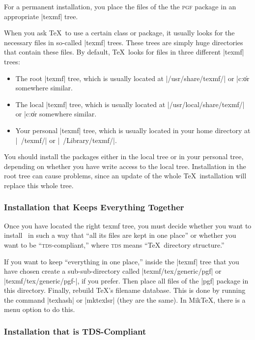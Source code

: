 For a permanent installation, you place the files of the
the \textsc{pgf} package in an appropriate |texmf| tree. 

When you ask \TeX\ to use a certain class or package, it usually looks
for the necessary files in so-called |texmf| trees. These trees
are simply huge directories that contain these files. By default,
\TeX\ looks for files in three different |texmf| trees:
\begin{itemize}
\item
  The root |texmf| tree, which is usually located at
  |/usr/share/texmf/| or |c:\texmf\| or somewhere similar.
\item
  The local  |texmf| tree, which is usually located at
  |/usr/local/share/texmf/| or |c:\localtexmf\| or somewhere similar.
\item
  Your personal  |texmf| tree, which is usually located in your home
  directory at |~/texmf/| or |~/Library/texmf/|.   
\end{itemize}

You should install the packages either in the local tree or in
your personal tree, depending on whether you have write access to the
local tree. Installation in the root tree can cause problems, since an
update of the whole \TeX\ installation will replace this whole tree.


\subsubsection{Installation that Keeps Everything Together}

Once you have located the right texmf tree, you must decide whether
you want to install \pgfname\ in such a way that ``all its files are
kept in one place'' or whether you want to be
``\textsc{tds}-compliant,'' where \textsc{tds} means ``\TeX\ directory
structure.''

If you want to keep ``everything in one place,'' inside the |texmf|
tree that you have chosen create a sub-sub-directory called
|texmf/tex/generic/pgf| or
|texmf/tex/generic/pgf-|\texttt{\pgfversion}, if you prefer. Then
place all files of the |pgf| package in this directory. Finally,
rebuild \TeX's filename database. This is done by running the command
|texhash| or |mktexlsr| (they are the same). In Mik\TeX, there is a
menu option to do this. 


\subsubsection{Installation that is TDS-Compliant}

